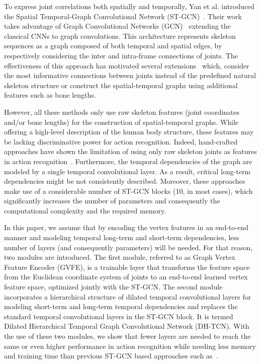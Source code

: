 \documentclass{article}
\begin{document}
To express joint correlations both spatially and temporally, Yan et al. introduced the Spatial Temporal-Graph Convolutional Network (ST-GCN)~\cite{yan2018spatial}. Their work takes advantage of Graph Convolutional Networks (GCN)~\cite{bruna2013spectral} extending the classical CNNs to graph convolutions. This architecture represents skeleton sequences as a graph composed of both temporal and spatial edges, by respectively considering the inter and intra-frame connections of joints. The effectiveness of this approach has motivated several extensions~\cite{shi2019two, shi2019skeleton, li2019actional} which, consider the most informative connections between joints instead of the predefined natural skeleton structure or construct the spatial-temporal graphs using additional features such as bone lengths.

However, all these methods only use raw skeleton features (joint coordinates and/or bone lengths) for the construction of spatial-temporal graphs. While offering a high-level description of the human body structure, these features may be lacking discriminative power for action recognition. Indeed, hand-crafted approaches have shown the limitation of using only raw skeleton joints as features in action recognition~\cite{zanfir2013moving, ghorbel2018kinematic}. Furthermore, the temporal dependencies of the graph are modeled by a single temporal convolutional layer. As a result, critical long-term dependencies might be not consistently described. Moreover, these approaches make use of a considerable number of ST-GCN blocks (10, in most cases), which significantly increases the number of parameters and consequently the computational complexity and the required memory.


In this paper, we assume that by encoding the vertex features in an end-to-end manner and modeling temporal long-term and short-term dependencies, less number of layers (and consequently parameters) will be needed. For that reason, two modules are introduced. The first module, referred to as Graph Vertex Feature Encoder (GVFE), is a trainable layer that transforms the feature space from the Euclidean coordinate system of joints to an end-to-end learned vertex feature space, optimized jointly with the ST-GCN. The second module incorporates a hierarchical structure of dilated temporal convolutional layers for modeling short-term and long-term temporal dependencies and replaces the standard temporal convolutional layers in the ST-GCN block. It is termed Dilated Hierarchical Temporal Graph Convolutional Network (DH-TCN). With the use of these two modules, we show that fewer layers are needed to reach the same or even higher performance in action recognition while needing less memory and training time than previous ST-GCN based approaches such as~\cite{li2019actional}.
\end{document}
